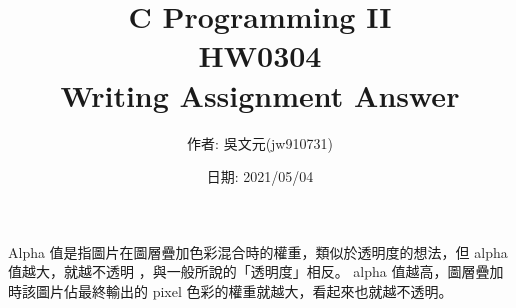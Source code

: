 \documentclass[a4paper,10pt]{article}
\title{C Programming II\\HW0304\\Writing Assignment Answer}
\author{作者: 吳文元(jw910731)}
\date{日期: 2021/05/04}
\begin{document}
\maketitle
Alpha 值是指圖片在圖層疊加色彩混合時的權重，類似於透明度的想法，但 alpha 值越大，就越不透明  ，與一般所說的「透明度」相反。 alpha 值越高，圖層疊加時該圖片佔最終輸出的 pixel 色彩的權重就越大，看起來也就越不透明。
\end{document}
